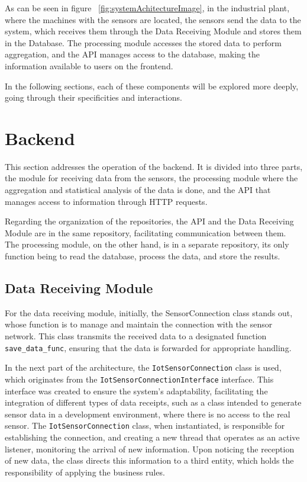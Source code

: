 As can be seen in figure ~\ref{fig:systemAchitectureImage}, in the industrial plant, where the machines with the sensors are located, the sensors send the data to the system, which receives them through the Data Receiving Module and stores them in the Database. The processing module accesses the stored data to perform aggregation, and the \gls{API} manages access to the database, making the information available to users on the frontend.

In the following sections, each of these components will be explored more deeply, going through their specificities and interactions.


\section[Backend]{Backend}
This section addresses the operation of the backend. It is divided into three parts, the module for receiving data from the sensors, the processing module where the aggregation and statistical analysis of the data is done, and the \gls{API} that manages access to information through \gls{HTTP} requests.

Regarding the organization of the repositories, the \gls{API} and the Data Receiving Module are in the same repository, facilitating communication between them. The processing module, on the other hand, is in a separate repository, its only function being to read the database, process the data, and store the results.

\subsection{Data Receiving Module}\label{subsec:receiveDataModuleArch}
For the data receiving module, initially, the SensorConnection class stands out, whose function is to manage and maintain the connection with the sensor network. This class transmits the received data to a designated function \texttt{save\_data\_func}, ensuring that the data is forwarded for appropriate handling.

In the next part of the architecture, the \texttt{IotSensorConnection} class is used, which originates from the \texttt{IotSensorConnectionInterface} interface. This interface was created to ensure the system's adaptability, facilitating the integration of different types of data receipts, such as a class intended to generate sensor data in a development environment, where there is no access to the real sensor. The \texttt{IotSensorConnection} class, when instantiated, is responsible for establishing the connection, and creating a new thread that operates as an active listener, monitoring the arrival of new information. Upon noticing the reception of new data, the class directs this information to a third entity, which holds the responsibility of applying the business rules.

